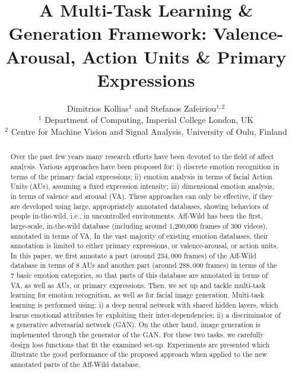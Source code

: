 \documentclass[a4paper, 10pt, conference]{ieeeconf}      %
\title{\LARGE \bf
A Multi-Task Learning \& Generation Framework: Valence-Arousal, Action Units \&  Primary Expressions
}
\begin{document}
\ifFGfinal



\author{\parbox{16cm}{\centering
    {\large Dimitrios Kollias$^1$ and Stefanos Zafeiriou$^{1,2}$}\\ 
    {\normalsize
    $^1$  Department of Computing, Imperial College London, UK \\
    $^2$ Centre for Machine Vision and Signal Analysis, University of Oulu, Finland}
    }
}
\thispagestyle{empty}
\pagestyle{empty}
\fi
\maketitle




\begin{abstract} 
Over the past few years many research efforts have been devoted to the field of affect analysis. Various approaches have been proposed for: i) discrete emotion recognition in terms of the primary facial expressions; ii) emotion analysis in terms of facial Action Units (AUs), assuming a fixed expression intensity; iii) dimensional emotion analysis, in terms of valence and arousal (VA). These approaches can only be effective, if they are developed using large, appropriately annotated databases, showing behaviors of people in-the-wild, i.e., in uncontrolled environments. Aff-Wild  has been the first, large-scale, in-the-wild database (including around 1,200,000 frames of 300 videos), annotated in terms of VA. In the vast majority of existing emotion databases, their annotation is limited to either primary expressions, or valence-arousal, or action units. In this paper, we first annotate a part (around $234,000$ frames) of the Aff-Wild database in terms of $8$ AUs and another part (around $288,000$ frames) in terms of the $7$ basic emotion categories, so that parts of this database are annotated in terms of VA, as well as AUs, or primary expressions. Then, we set up and tackle multi-task learning for emotion recognition, as well as for facial image generation. Multi-task learning is performed using: i) a deep neural network with shared hidden
layers, which learns emotional attributes by exploiting their inter-dependencies; ii) a discriminator of a generative adversarial network (GAN). On the other hand, image generation is implemented through the generator of the GAN. For these two tasks, we carefully design loss functions that fit the examined set-up. Experiments are presented which illustrate the good performance of the proposed approach when applied to the new  annotated parts of the Aff-Wild database.

\end{abstract}
\end{document}
